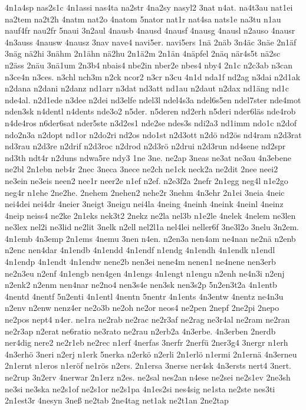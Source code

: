 {4n1a4sp
nas2s1c
4n1assi
nas4ta
na2str
4na2sy
nasyl2
3nat
n4at.
na4t3au
nat1ei
na2tem
na2t2h
4natm
nat2o
4natom
5nator
nat1r
nat4sa
nats1e
na3tu
n1au
nauf4fr
nau2fr
5naui
3n2aul
4nausb
4nausd
4nausf
4nausg
4nausl
n2auso
4nausr
4n3auss
4nausw
4nausz
3nav
nave4
navi5er.
navi5ers
1nä
2näb
3n4äc
3näe
2n1äf
3näg
nä2hi
3nähm
2n1ähn
nä2hu
2n1ä2m
2n1än
4näpfel
2näq
när4s5t
nä2sc
n2äss
2näu
3nä1um
2n3b4
nbais4
nbe2in
nber2e
nbes4
nby4
2n1c
n2c3ab
n3can
n3ce4n
n3ces.
n3chl
nch3m
n2ck
ncor2
n3cr
n3cu
4n1d
nda1f
nd2ag
n3dai
n2d1ak
n2dana
n2dani
n2danz
nd1arr
n3dat
nd3att
nd1au
n2daut
n2dax
nd1äng
nd1c
nde4al.
n2d1ede
n3dee
n2dei
nd3elfe
ndel3l
ndel4s3a
ndel6s5en
ndel7ster
nde4mot
nden3sk
n4dentl
n4dents
nde3o2
n5der.
n5deren
nd2erh
n5deri
nder6läs
nde4rob
n4de4ros
n6der6sat
nder5ste
n3d2es1
nde2se
ndes3s
ndi2a3
nd1imm
ndo1c
n2dof
ndo2n3a
n2dopt
nd1or
n2do2ri
nd2os
ndo1st
n2d3ott
n2dö
nd2ös
nd4ram
n2d3rat
nd3rau
n2d3re
n2drif
n2d3roc
n2drod
n2d3rö
n2drui
n2d3run
nd4sene
nd2spr
nd3th
ndt4r
n2duns
ndwa5re
ndy3
1ne
3ne.
ne2ap
3neas
ne3at
ne3au
4n3ebene
ne2bl
2n1ebn
neb4r
2nec
3neca
3nece
ne2ch
ne1ck
neck2a
ne2dit
2nee
neei2
ne3ein
ne3eis
neen2
nee1r
neer2e
n1ef
n2ef.
n2e3f2a
2nefr
2n1egg
neg4l
n1e2go
neg4r
n1ehe
2ne2he.
2nehem
2nehen2
nehe2r
3nehm
4n3ehr
2n1ei
3neia
4neic
nei4dei
nei4dr
4neier
3neigt
3neigu
nei4la
4neing
4neinh
4neink
4neinl
4neinz
4neip
neiss4
ne2ke
2n1eks
nek3t2
2nekz
ne2la
nel3b
n1e2le
4nelek
4nelem
ne3len
ne3lex
nel2i
ne3lid
ne2lit
3nelk
n2ell
nel2l1a
nel4lei
neller6f
3ne3l2o
3nelu
3n2em.
4n1emb
4n3emp
2n1ems
4nemu
3nen
n4en.
n2en3a
nen4am
ne4nan
ne2nä
n2enb
n2enc
nen4dar
4n1endb
4n1endd
4n1endf
n1endg
4n1endh
4n1endk
n1endl
4n1endp
4n1endt
4n1endw
nene2b
nen3ei
nene4m
nenen1
ne4nene
nen3erb
ne2n3eu
n2enf
4n1engb
nen4gen
4n1engs
4n1engt
n1engu
n2enh
ne4n3i
n2enj
n2enk2
n2enm
nen4nar
ne2no4
nen3s4e
nen3sk
nen3s2p
5n2en3t2a
4n1entb
4nentd
4nentf
5n2enti
4n1entl
4nentn
5nentr
4n1ents
4n3entw
4nentz
ne4n3u
n2env
n2enw
nenz4er
ne2o3b
ne2oh
ne2or
neos4
ne2pen
2nepf
2ne2pi
2nepo
ne2pos
nept4
n4er.
ne1ra
ne2rab
ne2rac
ne2r3af
ne2rag
ne3r4al
ne2ram
ne2ran
ne2r3ap
n2erat
ne6ratio
ne3rato
ne2rau
n2erb2a
4n3erbe.
4n3erben
2nerdb
ner4dig
nere2
ne2r1eb
ne2rec
n1erf
4nerfas
3nerfr
2nerfü
2ner3g4
3nergr
n1erh
4n3erhö
3neri
n2erj
n1erk
5nerka
n2erkö
n2erli
2n1erlö
n1ermi
2n1ernä
4n3erneu
2n1ernt
n1eros
n1eröf
ne1rös
n2ers.
2n1ersa
3nerse
ner4sk
4n3ersts
nert4
3nert.
ne2rup
3n2erv
4nerwar
2n1erz
n2es.
ne2sal
nes2an
n4ese
ne2sei
ne2s1ev
2ne3sh
ne3si
ne3ska
ne2s1of
ne2s1or
ne2s1pa
4n1es2si
nes4sig
ne1sta
ne2ste
nes3ti
2n1est3r
4nesyn
3neß
ne2tab
2ne4tag
net1ak
ne2t1an
2ne2tap
}
